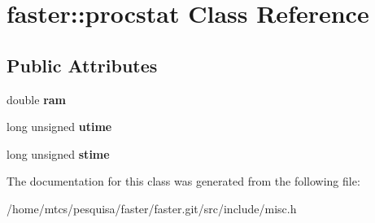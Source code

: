 \hypertarget{classfaster_1_1procstat}{}\section{faster\+:\+:procstat Class Reference}
\label{classfaster_1_1procstat}
\subsection*{Public Attributes}
\begin{DoxyCompactItemize}
\item 
\hypertarget{classfaster_1_1procstat_ad12d45d3f1d819e7613411835af89432}{}\label{classfaster_1_1procstat_ad12d45d3f1d819e7613411835af89432} 
double {\bfseries ram}
\item 
\hypertarget{classfaster_1_1procstat_a3033ca3dd5cf4fcca5d4f647149d21f7}{}\label{classfaster_1_1procstat_a3033ca3dd5cf4fcca5d4f647149d21f7} 
long unsigned {\bfseries utime}
\item 
\hypertarget{classfaster_1_1procstat_a8972e2ce24bf1961693edbd76344d1fd}{}\label{classfaster_1_1procstat_a8972e2ce24bf1961693edbd76344d1fd} 
long unsigned {\bfseries stime}
\end{DoxyCompactItemize}


The documentation for this class was generated from the following file\+:\begin{DoxyCompactItemize}
\item 
/home/mtcs/pesquisa/faster/faster.\+git/src/include/misc.\+h\end{DoxyCompactItemize}
